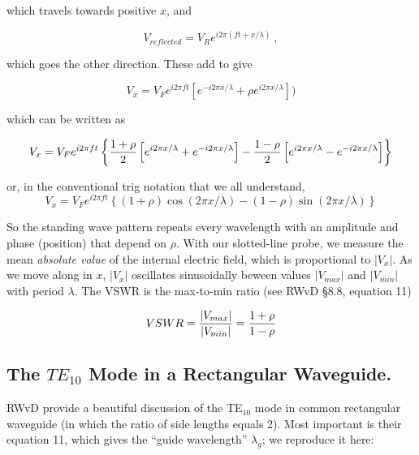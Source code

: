 \documentclass[preprint]{aastex}
\begin{document}
\noindent which travels towards positive $x$, and 

\begin{equation} 
V_{reflected} = V_R e^{i 2 \pi (f t + x/\lambda)} \ ,
\end{equation}

\noindent which goes the other direction. These add to give

\begin{equation}
V_x = V_F e^{i2 \pi f t} 
	\left[ e^{-i 2 \pi x/\lambda} + \rho e^{i 2 \pi x/\lambda} \right])
\end{equation}

\noindent which can be written as

\begin{equation} V_x = V_F e^{i2 \pi f t} \tolerance=10000\left\{
 {1 + \rho \over 2} \left[ e^{i 2 \pi x/\lambda} + e^{-i 2 \pi x/\lambda} \right]
-{1 - \rho \over 2} \left[ e^{i 2 \pi x/\lambda} - e^{-i 2 \pi
x/\lambda} \right]
\right\}
\end{equation}

\noindent or, in the conventional trig notation that we all understand,
\begin{equation} 
V_x = V_F e^{i2 \pi f t} \left\{ 
 (1 + \rho) \cos( 2 \pi x/\lambda)
-(1 - \rho) \sin( 2 \pi x/\lambda) \right\}
\end{equation}

\noindent So the standing wave pattern repeats every wavelength with an
amplitude and phase (position) that depend on $\rho$. With our
slotted-line probe, we measure the
mean {\it absolute value} of the internal electric field, which is proportional to
$|V_x|$. As we move along in $x$, $|V_x|$ oscillates sinusoidally beween
values $|V_{max}|$ and $|V_{min}|$ with
period $\lambda$. The VSWR is the max-to-min ratio (see RWvD \S 8.8,
equation 11)

\begin{equation} \label{vswreqn}
VSWR = {|V_{max}| \over |V_{min}|} = {1 + \rho \over 1 - \rho}
\end{equation}

\subsection{The $TE_{10}$ Mode in a Rectangular Waveguide.} 

	RWvD provide a beautiful discussion of the TE$_{10}$ mode in
common rectangular waveguide (in which the ratio of side lengths equals
2).  Most important is their equation 11, which gives the ``guide
wavelength'' $\lambda_g$; we reproduce it here:
\end{document}
